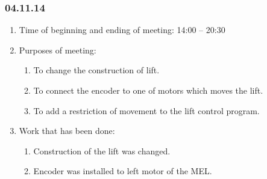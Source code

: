 \subsubsection{04.11.14}

\begin{enumerate}
	\item Time of beginning and ending of meeting:
	14:00 – 20:30
	\item Purposes of meeting:
	\begin{enumerate}
		\item To change the construction of lift.
		
		\item To connect the encoder to one of motors which moves the lift.
		
		\item To add a restriction of movement to the lift control program.
		
	\end{enumerate}
	
	\item Work that has been done:
	\begin{enumerate}
		\item Construction of the lift was changed.
		
		\item Encoder was installed to left motor of the MEL.
		

\end{enumerate}
\end{enumerate}
